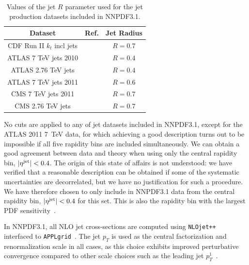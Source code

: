 \begin{table}[H]
\small
\begin{centering}
    \renewcommand{\arraystretch}{1.4}
\begin{tabular}{|c|c|c|}
  \hline
  Dataset  &  Ref.  & Jet Radius \\
  \hline
  \hline
  CDF Run II $k_t$ incl jets & \cite{Abulencia:2007ez} & $R=0.7$
  \tabularnewline
   ATLAS   7 TeV jets 2010 & \cite{Aad:2011fc}  &  $R=0.4$
\tabularnewline
  ATLAS    2.76 TeV jets & \cite{Aad:2013lpa}  & $R=0.4$
\tabularnewline
ATLAS      7 TeV jets 2011   &  \cite{Aad:2014vwa}  & $R=0.6$
\tabularnewline
 CMS   7 TeV jets 2011     & \cite{Chatrchyan:2012bja}&  $R=0.7$
\tabularnewline
 CMS  2.76 TeV jets       & \cite{Khachatryan:2015luy}& $R=0.7$
 \tabularnewline
 \hline
 \end{tabular}
\par\end{centering}
\caption{\small Values of the jet $R$ parameter used for the
  jet production datasets included in NNPDF3.1.
\label{jetRadius}
}
\end{table}

No cuts are applied to any of jet datasets included in NNPDF3.1, except 
for the ATLAS 2011 7~TeV data, for which  achieving a good description 
turns out to be impossible if all five rapidity bins are
included simultaneously.
%
We can obtain a good agreement between data
and theory when using only the central rapidity bin,
$|\eta^{\rm jet}|<0.4$.
%
The origin of this state of affairs is 
not understood: we have verified
that a reasonable description can be obtained if some of the
systematic uncertainties are decorrelated, but we have no
justification for such a procedure. We have therefore chosen to only include 
in NNPDF3.1 data from the central rapidity bin,
$|\eta^{\rm jet}|<0.4$ for this set. This is also the rapidity bin with the 
largest PDF sensitivity~\cite{Rojo:2014kta}. 


In NNPDF3.1, all NLO jet cross-sections are computed using
 {\tt NLOjet++}~\cite{Nagy:2001fj}
interfaced to {\tt APPLgrid}~\cite{Carli:2010rw}.
The jet $p_T$ is used as the central factorization and
renormalization scale 
in all cases, as this choice exhibits improved perturbative
convergence compared to other scale choices such as the leading
jet $p_T^{1}$~\cite{Carrazza:2014hra,Currie:2017ctp}.


